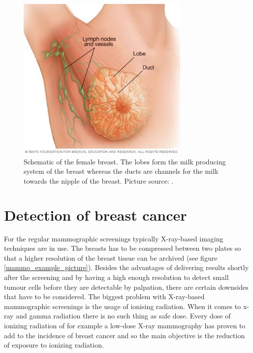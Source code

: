 \begin{figure}[H]
    \centering
    \includegraphics[width=0.75\textwidth]{Graphics/breast.jpg}
    \caption{Schematic of the female breast. The lobes form the milk producing system of the breast whereas the ducts are channels for the milk towards the nipple of the breast. Picture source: \cite{mayo-clinic}. }
    \label{anatomy_breast}
\end{figure}




\section{Detection of breast cancer}


For the regular mammographic screenings typically X-ray-based imaging techniques are in use. The breasts has to be compressed between two plates so that a higher resolution of the breast tissue can be archived (see figure \ref{mammo_example_picture}). Besides the advantages of delivering results shortly after the screening and by having a high enough resolution to detect small tumour cells before they are detectable by palpation, there are certain downsides that have to be considered.
The biggest problem with X-ray-based mammographic screenings is the usage of ionising radiation. When it comes to x-ray and gamma radiation there is no such thing as safe dose. Every dose of ionizing radiation of for example a low-dose X-ray mammography has proven to add to the incidence of breast cancer  \cite{Pauwels2015BreastRadiobiology} and so the main objective is the reduction of exposure to ionizing radiation.


